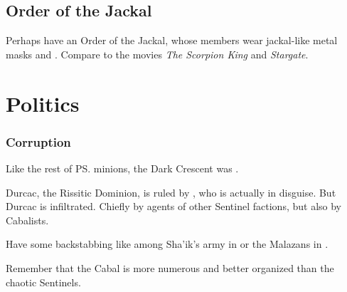 \subsection{Order of the Jackal}
Perhaps have an Order of the Jackal, whose members wear jackal-like metal masks and \armour. Compare to the movies \emph{The Scorpion King} and \emph{Stargate}. 
















\section{Politics}




\subsubsection{Corruption}
Like the rest of \ps{\Secherdamon} minions, the Dark Crescent was . 

Durcac, the Rissitic Dominion, is ruled by \HriistN, who is actually \HriistD{} in disguise. 
But Durcac is infiltrated. 
Chiefly by agents of other Sentinel factions, but also by Cabalists. 

Have some backstabbing like among Sha'ik's army in \cite{StevenErikson:HouseofChains} or the Malazans in \cite{StevenErikson:TheBonehunters}. 

Remember that the Cabal is more numerous and better organized than the chaotic Sentinels. 





